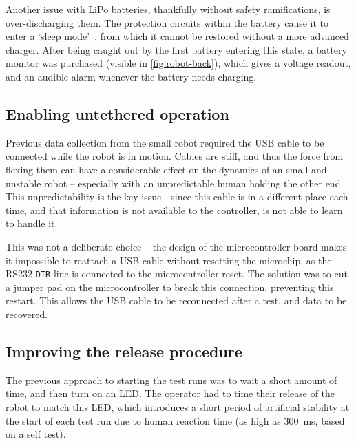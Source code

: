 \documentclass[main.tex]{subfiles}
\begin{document}
Another issue with LiPo batteries, thankfully without safety ramifications, is over-discharging them. The protection circuits within the battery cause it to enter a `sleep mode'~\cite{lipo-sleep-mode}, from which it cannot be restored without a more advanced charger. After being caught out by the first battery entering this state, a battery monitor was purchased (visible in \cref{fig:robot-back}), which gives a voltage readout, and an audible alarm whenever the battery needs charging.


\subsection{Enabling untethered operation}
	\label{sec:untethered}

	Previous data collection from the small robot required the USB cable to be connected while the robot is in motion. Cables are stiff, and thus the force from flexing them can have a considerable effect on the dynamics of an small and unstable robot -- especially with an unpredictable human holding the other end. This unpredictability is the key issue - since this cable is in a different place each time, and that information is not available to the controller, {\Pilco} is not able to learn to handle it.

	This was not a deliberate choice -- the design of the microcontroller board makes it impossible to reattach a USB cable without resetting the microchip, as the RS232 \texttt{DTR} line is connected to the microcontroller reset\footnotemark. The solution was to cut a jumper pad on the microcontroller to break this connection, preventing this restart. This allows the USB cable to be reconnected after a test, and data to be recovered.


\subsection{Improving the release procedure}
	\label{sec:switch}

	The previous approach to starting the test runs was to wait a short amount of time, and then turn on an LED.
	The operator had to time their release of the robot to match this LED, which introduces a short period of artificial stability at the start of each test run due to human reaction time (as high as \SI{300}{\milli\second}, based on a self test).
\end{document}
